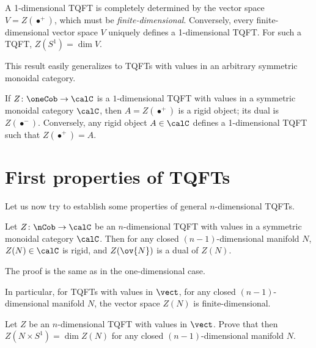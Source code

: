 \begin{theorem}\label{t:1d-tqft2}
  A 1-dimensional TQFT is completely determined by the vector space
  $V=Z(\bullet^+)$, which must be \emph{finite-dimensional}. Conversely, every
  finite-dimensional vector space $V$ uniquely defines a 1-dimensional TQFT. For
  such a TQFT, $Z(S^1)=\dim V$.
\end{theorem}

This result easily generalizes to TQFTs with values in an arbitrary
symmetric monoidal category.
\begin{theorem}\label{t:1d-tqft}
  If $Z\colon \oneCob\to \calC$ is a $1$-dimensional TQFT with values in a
  symmetric monoidal category $\calC$, then $A=Z(\bullet^+)$ is a rigid object;
  its dual is $Z(\bullet^-)$. Conversely, any rigid object $A\in \calC$ defines
  a 1-dimensional TQFT such that $Z(\bullet^+)=A$.
\end{theorem}



\section{First properties of TQFTs}\label{s:first-properties}



Let us now try to establish some properties of general $n$-dimensional TQFTs.

\begin{theorem}\label{t:tqft-rigidity}
  Let $Z\colon \nCob\to \calC$ be an $n$-dimensional TQFT with values in a
  symmetric monoidal category $\calC$. Then for any closed $(n-1)$-dimensional
  manifold $N$, $Z(N)\in \calC$ is rigid, and $Z(\ov{N})$ is a dual of $Z(N)$.
\end{theorem}
The proof is the same as in the one-dimensional case.

In particular, for TQFTs with values in $\vect$, for any closed
$(n-1)$-dimensional manifold $N$, the vector space $Z(N)$ is finite-dimensional.

\begin{exercise}\label{ec:tqft-duality}
  Let $Z$ be an $n$-dimensional TQFT with values in $\vect$.
  Prove that then
  $Z(N\times S^1)=\dim Z(N)$ for any closed $(n-1)$-dimensional manifold $N$.
\end{exercise}


